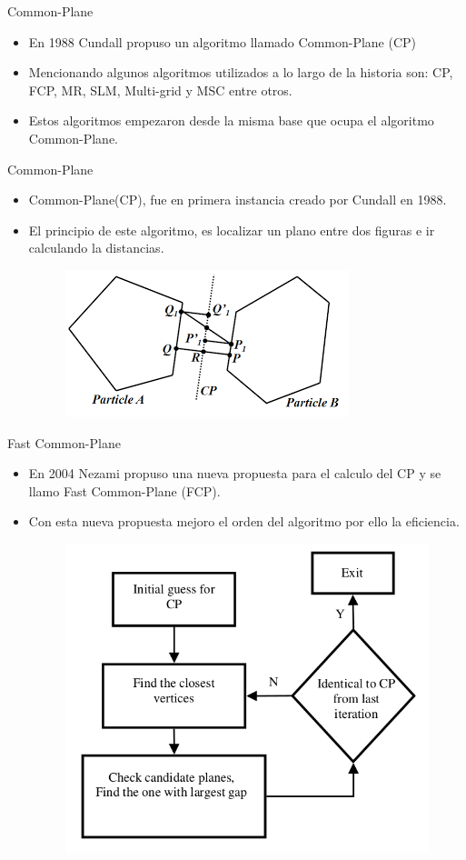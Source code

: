 \documentclass[11pt]{beamer}
\begin{document}
\begin{frame}{Common-Plane}
 \begin{itemize}
  \item En 1988 Cundall\cite{1988-Cundall} propuso un algoritmo llamado Common-Plane (CP)
  \item Mencionando algunos algoritmos utilizados a lo largo de la historia son: CP, FCP, MR, SLM, Multi-grid y MSC entre otros.
  \item Estos algoritmos empezaron desde la misma base que ocupa el algoritmo Common-Plane.
 \end{itemize}
\end{frame}

\begin{frame}{Common-Plane}
 \begin{itemize}
  \item Common-Plane(CP), fue en primera instancia creado por Cundall en 1988.
  \item El principio de este algoritmo, es localizar un plano entre dos figuras e ir calculando la distancias.
  \begin{figure}[\centering]
  \includegraphics[width=0.5\linewidth]{img/CP}
  \end{figure}

 \end{itemize}
\end{frame}

\begin{frame}{Fast Common-Plane}
 \begin{itemize}
  \item En 2004 Nezami \cite{2004-Nezami} propuso una nueva propuesta para el calculo del CP y se llamo Fast Common-Plane (FCP).
  \item Con esta nueva propuesta mejoro el orden del algoritmo por ello la eficiencia.
  \begin{figure}[\centering]
  \includegraphics[width = 0.5\linewidth]{img/Diagrama-FCP}
  \end{figure}

 \end{itemize}
\end{frame}
\end{document}
